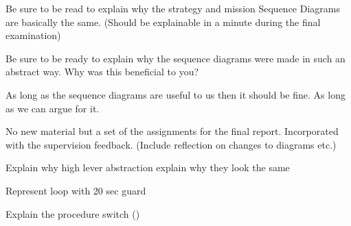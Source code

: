 
Be sure to be read to explain why the strategy and mission Sequence Diagrams are basically the same. (Should be explainable in a minute during the final examination)

Be sure to be ready to explain why the sequence diagrams were made in such an abstract way. Why was this beneficial to you?

As long as the sequence diagrams are useful to us then it should be fine. As long as we can argue for it.

No new material but a set of the assignments for the final report. Incorporated with the supervision feedback. (Include reflection on changes to diagrams etc.)








Explain why high lever abstraction
explain why they look the same

Represent loop with 20 sec guard

Explain the procedure switch ()